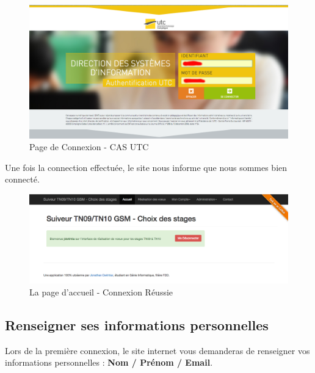 \documentclass[a4paper,titlepage]{scrartcl}
\begin{document}
\begin{figure}[H]
	\vspace{-3mm}
	\begin{center}
		\includegraphics[scale=0.34]{Images/casUTC.png}
		\caption{Page de Connexion - CAS UTC}
	\end{center}
	\vspace{-2cm}
\end{figure}

\clearpage

Une fois la connection effectuée, le site nous informe que nous sommes bien connecté.\\

\begin{figure}[H]
	\vspace{-3mm}
	\begin{center}
		\includegraphics[scale=0.32]{Images/homepage_connected.png}
		\caption{La page d'accueil - Connexion Réussie}
	\end{center}
\end{figure}

\vspace{1cm}
\subsection{Renseigner ses informations personnelles}

Lors de la première connexion, le site internet vous demanderas de renseigner vos informations personnelles : \textbf{Nom / Prénom / Email}.\\
\end{document}
